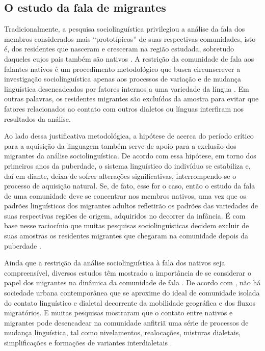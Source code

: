 \documentclass[
		a4paper,	%
		12pt,		%
		]{article}	%
\begin{document}
	\subsection{O estudo da fala de migrantes}

	Tradicionalmente, a pesquisa sociolinguística privilegiou a análise da fala dos
	membros considerados mais \enquote{prototípicos} de suas respectivas
	comunidades, isto é, dos residentes que nasceram e cresceram na região estudada,
	sobretudo daqueles cujos pais também são nativos \citep{Britain2018,
	Oushiro2016, Milroy2002, Kerswill1993}. A restrição da comunidade de fala
	aos falantes nativos é um procedimento metodológico que busca circunscrever a
	investigação sociolinguística apenas aos processos de variação e de mudança
	linguística desencadeados por fatores internos a uma variedade da língua
	\citep[][p.  20]{Milroy2002, Labov2001}. Em outras palavras, os residentes
	migrantes são excluídos da amostra para evitar que fatores relacionados ao
	contato com outros dialetos ou línguas interfiram nos resultados da análise.

	Ao lado dessa justificativa metodológica, a hipótese de \citet{Lenneberg1967}
	acerca do período crítico para a aquisição da linguagem também serve de apoio
	para a exclusão dos migrantes da análise sociolinguística. De acordo com essa
	hipótese, em torno dos primeiros anos da puberdade, o sistema linguístico do
	indivíduo se estabiliza e, daí em diante, deixa de sofrer alterações
	significativas, interrompendo-se o processo de aquisição natural. Se, de fato,
	esse for o caso, então o estudo da fala de uma comunidade deve se concentrar nos
	membros nativos, uma vez que os padrões linguísticos dos migrantes adultos
	refletirão os padrões das variedades de suas respectivas regiões de origem,
	adquiridos no decorrer da infância. É com base nesse raciocínio que muitas
	pesquisas sociolinguísticas decidem excluir de suas amostras os residentes
	migrantes que chegaram na comunidade depois da puberdade \citep[p. ex.][p.
	111]{Labov1966}.

	Ainda que a restrição da análise sociolinguística à fala dos nativos seja
	compreensível, diversos estudos têm mostrado a importância de se considerar o
	papel dos migrantes na dinâmica da comunidade de fala \citep{Britain2018,
	Bortoni-Ricardo2011, Trudgill1986}. De acordo com \citet{Milroy2002}, não há
	sociedade urbana contemporânea que se aproxime do ideal de comunidade isolada do
	contato linguístico e dialetal decorrente da mobilidade geográfica e dos fluxos
	migratórios. E muitas pesquisas mostraram que o contato entre nativos e
	migrantes pode desencadear na comunidade anfitriã uma série de processos de
	mudança linguística, tal como nivelamentos, realocações, misturas dialetais,
	simplificações e formações de variantes interdialetais \citep{Trudgill1986}.
\end{document}
